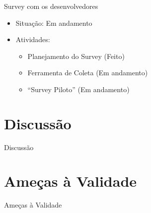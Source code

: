 \documentclass[t,14pt,mathserif]{beamer}
\begin{document}
\begin{frame}{Survey com os desenvolvedores}
		\begin{itemize}
			\item Situação: Em andamento
			\item Atividades:
			\begin{itemize}
				\item Planejamento do Survey (Feito)
				\item Ferramenta de Coleta (Em andamento)
				\item ``Survey Piloto'' (Em andamento)
			\end{itemize}
		\end{itemize}
\end{frame}

\section{Discussão}

\begin{frame}{Discussão}

\end{frame}

\section{Ameças à Validade}

\begin{frame}{Ameças à Validade}

\end{frame}
\end{document}
